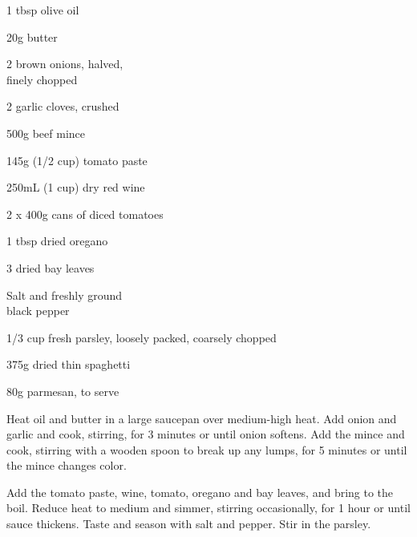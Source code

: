 


\begin{recipe}

\begin{ingredients}
	\item{1 tbsp olive oil}
	\item{20g butter}
	\item{2 brown onions, halved,\\ finely chopped}
	\item{2 garlic cloves, crushed}
	\item{500g beef mince}
	\item{145g (1/2 cup) tomato paste}
	\item{250mL (1 cup) dry red wine}
	\item{2 x 400g cans of diced tomatoes}
	\item{1 tbsp dried oregano}
	\item{3 dried bay leaves}
	\item{Salt and freshly ground\\ black pepper}
	\item{1/3 cup fresh parsley, loosely packed, coarsely chopped}
	\item{375g dried thin spaghetti}
	\item{80g parmesan, to serve}
\end{ingredients}

\begin{instructions}
\item Heat oil and butter in a large saucepan over medium-high heat. Add onion and garlic and cook, stirring, for 3 minutes or until onion softens. Add the mince and cook, stirring with a wooden spoon to break up any lumps, for 5 minutes or until the mince changes color.

\item Add the tomato paste, wine, tomato, oregano and bay leaves, and bring to the boil. Reduce heat to medium and simmer, stirring occasionally, for 1 hour or until sauce thickens. Taste and season with salt and pepper. Stir in the parsley.


\end{instructions}
\end{recipe}
